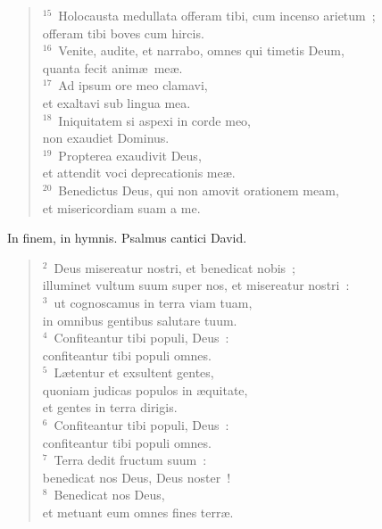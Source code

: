 \begin{flushleft}
\begin{verse}
${}^{15}$~Holocausta medullata offeram tibi, cum incenso arietum~;\\ offeram tibi boves cum hircis.\\
${}^{16}$~Venite, audite, et narrabo, omnes qui timetis Deum,\\ quanta fecit anim\ae\ me\ae .\\
${}^{17}$~Ad ipsum ore meo clamavi,\\ et exaltavi sub lingua mea.\\
${}^{18}$~Iniquitatem si aspexi in corde meo,\\ non exaudiet Dominus.\\
${}^{19}$~Propterea exaudivit Deus,\\ et attendit voci deprecationis me\ae .\\
${}^{20}$~Benedictus Deus, qui non amovit orationem meam,\\ et misericordiam suam a me.\end{verse}\end{flushleft}



\bchapter
\lettrine[lines=3,image=true,loversize=0.05,lraise=-0.03]{I}{}n finem, in hymnis. Psalmus cantici David.
\begin{flushleft}\begin{verse}\vspace{6pt}${}^{2}$~Deus misereatur nostri, et benedicat nobis~;\\ illuminet vultum suum super nos, et misereatur nostri~:\\
${}^{3}$~ut cognoscamus in terra viam tuam,\\ in omnibus gentibus salutare tuum.\\
${}^{4}$~Confiteantur tibi populi, Deus~:\\ confiteantur tibi populi omnes.\\
${}^{5}$~L\ae tentur et exsultent gentes,\\ quoniam judicas populos in \ae quitate,\\ et gentes in terra dirigis.\\
${}^{6}$~Confiteantur tibi populi, Deus~:\\ confiteantur tibi populi omnes.\\
${}^{7}$~Terra dedit fructum suum~:\\ benedicat nos Deus, Deus noster~!\\
${}^{8}$~Benedicat nos Deus,\\ et metuant eum omnes fines terr\ae .\end{verse}\end{flushleft}



